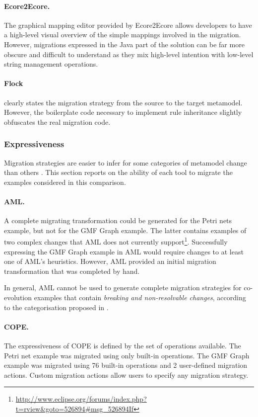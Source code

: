 \paragraph{Ecore2Ecore.} The graphical mapping editor provided by Ecore2Ecore allows developers to have a high-level visual overview of the simple mappings involved in the migration. However, migrations expressed in the Java part of the solution can be far more obscure and difficult to understand as they mix high-level intention with low-level string management operations.

\paragraph{Flock} clearly states the migration strategy from the source to the target metamodel.
However, the boilerplate code necessary to implement rule inheritance slightly obfuscates the real migration code.



\subsubsection{Expressiveness}
Migration strategies are easier to infer for some categories of metamodel change than others \cite{gruschko07towards}. This section reports on the ability of each tool to migrate the examples considered in this comparison.

\paragraph{AML.} A complete migrating transformation could be generated for the Petri nets example, but not for the GMF Graph example. The latter contains examples of two complex changes that AML does not currently support\footnote{\url{http://www.eclipse.org/forums/index.php?t=rview&goto=526894#msg_526894If}}. Successfully expressing the GMF Graph example in AML would require changes to at least one of AML's heuristics. However, AML provided an initial migration transformation that was completed by hand.

In general, AML cannot be used to generate complete migration strategies for co-evolution examples that contain \emph{breaking and non-resolvable changes}, according to the categorisation proposed in \cite{gruschko07towards}. 

\paragraph{COPE.} The expressiveness of COPE is defined by the set of operations available. The Petri net example was migrated using only built-in operations. The GMF Graph example was migrated using 76 built-in operations and 2 user-defined migration actions. Custom migration actions allow users to specify any migration strategy.

